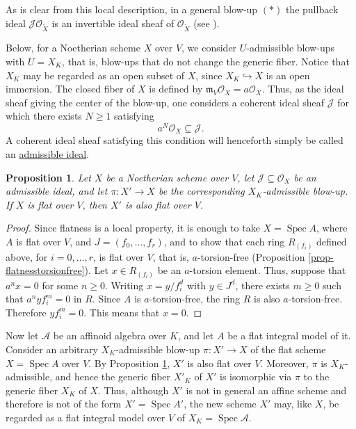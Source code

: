 \documentclass[a4paper,12pt, dvipdfmx]{jsbook}
\def\O{\mathscr{O}}
\def\m{\mathfrak{m}}
\def\til#1{\widetilde{#1}}%
\def\Spec{\mathop{\mathrm{Spec}}\nolimits}
\theoremstyle{plain}
\newtheorem{prop}[thm]{\bfseries Proposition}
\theoremstyle{definition}
\begin{document}
As is clear from this local description, in a general blow-up $(\ast)$ the pullback ideal $\mathscr{J}\O_{\til{X}}$ is an invertible ideal sheaf of $\O_{\til{X}}$ (see \cite[Chap.\ II, Prop.\ 7.13 (a)]{Hart2}).

Below, for a Noetherian scheme $X$ over $V$, we consider $U$-admissible blow-ups with $U=X_K$, that is, blow-ups that do not change the generic fiber.
Notice that $X_K$ may be regarded as an open subset of $X$, since $X_K\hookrightarrow X$ is an open immersion.
The closed fiber of $X$ is defined by $\m_V\O_X=a\O_X$. Thus, as the ideal sheaf giving the center of the blow-up, one considers a coherent ideal sheaf $\mathscr{J}$ for which there exists $N\geq 1$ satisfying
$$
a^N\O_X\subseteq\mathscr{J}.
$$
A coherent ideal sheaf satisfying this condition will henceforth simply be called an \underline{admissible ideal}.

\begin{prop}\label{prop-admissibleblowupflatness}{\rm 
Let $X$ be a Noetherian scheme over $V$, let $\mathscr{J}\subseteq\O_X$ be an admissible ideal, and let $\pi\colon X'\rightarrow X$ be the corresponding $X_K$-admissible blow-up.
If $X$ is flat over $V$, then $X'$ is also flat over $V$.}
\end{prop}

\begin{proof}[Proof]
Since flatness is a local property, it is enough to take $X=\Spec A$, where $A$ is flat over $V$, and $J=(f_0,\ldots,f_r)$, and to show that each ring $R_{(f_i)}$ defined above, for $i=0,\ldots,r$, is flat over $V$, that is, $a$-torsion-free (Proposition \ref{prop-flatnesstorsionfree}).
Let $x\in R_{(f_i)}$ be an $a$-torsion element.
Thus, suppose that $a^nx=0$ for some $n\geq 0$.
Writing $x=y/f^d_i$ with $y\in J^d$, there exists $m\geq 0$ such that $a^nyf^m_i=0$ in $R$.
Since $A$ is $a$-torsion-free, the ring $R$ is also $a$-torsion-free.
Therefore $yf^m_i=0$.
This means that $x=0$.
\end{proof}

Now let $\mathcal{A}$ be an affinoid algebra over $K$, and let $A$ be a flat integral model of it.
Consider an arbitrary $X_K$-admissible blow-up $\pi\colon X'\rightarrow X$ of the flat scheme $X=\Spec A$ over $V$.
By Proposition \ref{prop-admissibleblowupflatness}, $X'$ is also flat over $V$.
Moreover, $\pi$ is $X_K$-admissible, and hence the generic fiber $X'_K$ of $X'$ is isomorphic via $\pi$ to the generic fiber $X_K$ of $X$.
Thus, although $X'$ is not in general an affine scheme and therefore is not of the form $X'=\Spec A'$, the new scheme $X'$ may, like $X$, be regarded as a flat integral model over $V$ of $X_K=\Spec\mathcal{A}$.
\end{document}
